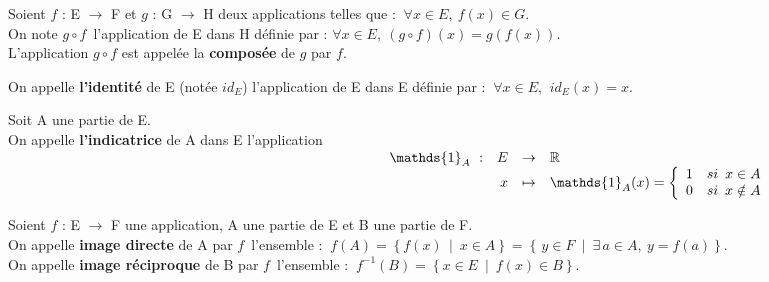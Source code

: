 Soient \(f\) : E \(\to\) F et \(g\) : G \(\to\) H deux applications telles que : \(\ \forall x\in E,\ f(x)\in G \). \\
On note \(g\circ f\,\) l'application de E dans H définie par : \(\forall x\in E,\ (g\circ f)(x)=g(f(x)). \)\\
L'application \(g\circ f\) est appelée la \textbf{composée} de $g$ par $f$.

\vspace{1cm}

\noindent On appelle \textbf{l'identité} de E (notée $id_E$) l'application de E dans E définie par : \(\ \forall x\in E,\ \,id_E(x)=x. \)

\vspace{1cm}

Soit A une partie de E.\\
On appelle \textbf{l'indicatrice} de A dans E l'application \vspace{-0.46cm} \\
\( 
\begin{array}{rrcl}
    \hspace{9.4cm} \mathds{1}_A\ : & E & \to & \RR  \\
                               & x & \mapsto & \mathds{1}_A(x)= \left\{ \begin{array}{ll}
                                                                            1 & si\ \,x\in A \\
                                                                            0 & si\ \,x\notin A
                                                                         \end{array} \right.
\end{array}
\)



\vspace{1cm}

Soient \(f\) : E \(\to\) F une application, A une partie de E et B une partie de F.\vspace{0.1cm} \\ 
On appelle \textbf{image directe} de A par \(f\,\) l'ensemble : \(\ f(A)=\left\{f(x)\, \mid \ x\in A\right\} = \left\{ \,y\in F\: \mid \: \exists \, a\in A,\ y=f(a)\right\}\).\vspace{0.1cm} \\ 
On appelle \textbf{image réciproque} de B par \(f\,\) l'ensemble : \(\ f^{-1}(B)=\left\{x\in E \ \mid \ f(x)\in B \right\}\).

